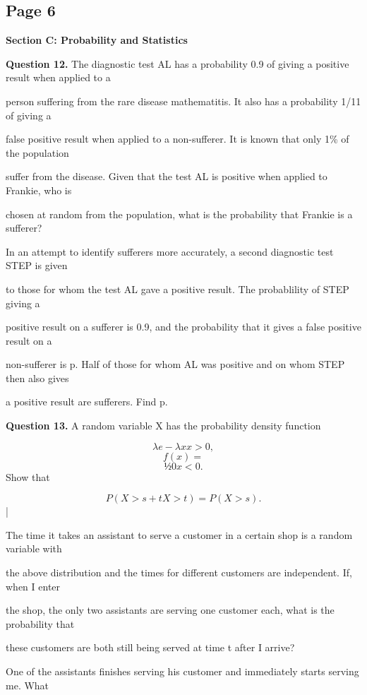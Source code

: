 \documentclass[12pt]{article}
\begin{document}
\subsection*{Page 6}
\begin{flushleft}
\bigskip\textbf{Section C: Probability and Statistics}\par
\bigskip\textbf{Question 12.} The diagnostic test AL has a probability 0.9 of giving a positive result when applied to a\par
person suffering from the rare disease mathematitis. It also has a probability 1/11 of giving a\par
false positive result when applied to a non-sufferer. It is known that only 1\% of the population\par
suffer from the disease. Given that the test AL is positive when applied to Frankie, who is\par
chosen at random from the population, what is the probability that Frankie is a sufferer?\par
In an attempt to identify sufferers more accurately, a second diagnostic test STEP is given\par
to those for whom the test AL gave a positive result. The probablility of STEP giving a\par
positive result on a sufferer is 0.9, and the probability that it gives a false positive result on a\par
non-sufferer is p. Half of those for whom AL was positive and on whom STEP then also gives\par
a positive result are sufferers. Find p.\par
\bigskip\textbf{Question 13.} A random variable X has the probability density function\par
\[λe -λx x > 0,\]
\[f (x) =\]
\[½ 0 x < 0.\]
Show that\par
\[P(X > s + t X > t) = P(X > s).\]
|\par
The time it takes an assistant to serve a customer in a certain shop is a random variable with\par
the above distribution and the times for different customers are independent. If, when I enter\par
the shop, the only two assistants are serving one customer each, what is the probability that\par
these customers are both still being served at time t after I arrive?\par
One of the assistants finishes serving his customer and immediately starts serving me. What\par

\end{flushleft}
\end{document}

